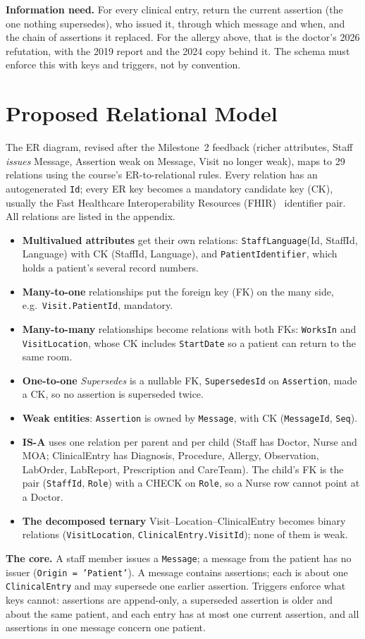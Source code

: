 \documentclass[sigconf]{acmart}
\begin{document}
\textbf{Information need.} For every clinical entry, return the current assertion (the one nothing supersedes), who issued it, through which message and when, and the chain of assertions it replaced. For the allergy above, that is the doctor's 2026 refutation, with the 2019 report and the 2024 copy behind it. The schema must enforce this with keys and triggers, not by convention.

\section{Proposed Relational Model}\label{sec:model}
The ER diagram, revised after the Milestone~2 feedback (richer attributes, Staff \emph{issues} Message, Assertion weak on Message, Visit no longer weak), maps to 29 relations using the course's ER-to-relational rules. Every relation has an autogenerated \texttt{Id}; every ER key becomes a mandatory candidate key (CK), usually the Fast Healthcare Interoperability Resources (FHIR)~\cite{fhir-r4} identifier pair. All relations are listed in the appendix.
\begin{itemize}
\item \textbf{Multivalued attributes} get their own relations: \texttt{StaffLanguage}(Id, StaffId, Language) with CK (StaffId, Language), and \texttt{PatientIdentifier}, which holds a patient's several record numbers.
\item \textbf{Many-to-one} relationships put the foreign key (FK) on the many side, e.g.\ \texttt{Visit.PatientId}, mandatory.
\item \textbf{Many-to-many} relationships become relations with both FKs: \texttt{WorksIn} and \texttt{VisitLocation}, whose CK includes \texttt{StartDate} so a patient can return to the same room.
\item \textbf{One-to-one} \emph{Supersedes} is a nullable FK, \texttt{SupersedesId} on \texttt{Assertion}, made a CK, so no assertion is superseded twice.
\item \textbf{Weak entities}: \texttt{Assertion} is owned by \texttt{Message}, with CK (\texttt{MessageId}, \texttt{Seq}).
\item \textbf{IS-A} uses one relation per parent and per child (Staff has Doctor, Nurse and MOA; ClinicalEntry has Diagnosis, Procedure, Allergy, Observation, LabOrder, LabReport, Prescription and CareTeam). The child's FK is the pair (\texttt{StaffId}, \texttt{Role}) with a CHECK on \texttt{Role}, so a Nurse row cannot point at a Doctor.
\item \textbf{The decomposed ternary} Visit--Location--ClinicalEntry becomes binary relations (\texttt{VisitLocation}, \texttt{ClinicalEntry.VisitId}); none of them is weak.
\end{itemize}
\textbf{The core.} A staff member issues a \texttt{Message}; a message from the patient has no issuer (\texttt{Origin = 'Patient'}). A message contains assertions; each is about one \texttt{ClinicalEntry} and may supersede one earlier assertion. Triggers enforce what keys cannot: assertions are append-only, a superseded assertion is older and about the same patient, and each entry has at most one current assertion, and all assertions in one message concern one patient.
\end{document}
